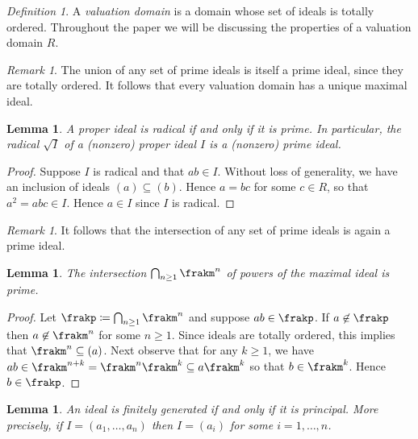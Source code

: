 \documentclass{amsart}
\numberwithin{equation}{section}%
\newtheorem{Lem}[equation]{Lemma}
\theoremstyle{remark}
\newtheorem{Def}[equation]{Definition}
\newtheorem{Rem}[equation]{Remark}
\begin{document}
\begin{Def}
	A \emph{valuation domain} is a domain whose set of ideals is totally ordered. Throughout the paper we will be discussing the properties of a valuation domain $R$.
\end{Def}

\begin{Rem}\label{rem:union} 
	The union of any set of prime ideals is itself a prime ideal, since they are totally ordered. It follows that every valuation domain has a unique maximal ideal.
\end{Rem}

\begin{Lem}\label{lem:radical-is-prime}
	A proper ideal is radical if and only if it is prime. In particular, the radical $\sqrt{I}$ of a (nonzero) proper ideal $I$ is a (nonzero) prime ideal.
\end{Lem}

\begin{proof}
	Suppose $I$ is radical and that $ab \in I$. Without loss of generality, we have an inclusion of ideals $(a) \subseteq (b)$. Hence $a =bc$ for some $c \in R$, so that $a^2 = abc \in I$. Hence $a \in I$ since $I$ is radical.
\end{proof}

\begin{Rem}\label{rem:intersection}
	It follows that the intersection of any set of prime ideals is again a prime ideal.
\end{Rem}

\begin{Lem}\label{lem:m-power}
	The intersection $\bigcap_{n \ge 1}\frakm^n$ of powers of the maximal ideal is prime.
\end{Lem}

\begin{proof}
	Let $\frakp \coloneqq \bigcap_{n \ge 1}\frakm^n$ and suppose $ab \in \frakp$. If $a \not\in\frakp$ then $a \not\in \frakm^n$ for some $n \ge 1$. Since ideals are totally ordered, this implies that $\frakm^n \subseteq (a)$. Next observe that for any $k \ge 1$, we have $ab \in \frakm^{n+k} = \frakm^n \frakm^k \subseteq a\frakm^k$ so that $b \in \frakm^k$. Hence $b \in \frakp$.
\end{proof}

\begin{Lem}\label{lem:fg-principal}
	An ideal is finitely generated if and only if it is principal. More precisely, if $I=(a_1,\ldots,a_n)$ then $I=(a_i)$ for some $i=1,\ldots,n$.
\end{Lem}
\end{document}
